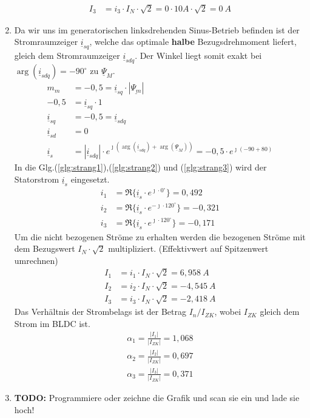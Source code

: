 \begin{solution}
\begin{enumerate}
\begin{align}
I_3 & = i_3 \cdot I_N \cdot \sqrt{2} =0 \cdot 10 A \cdot \sqrt{2} =0~A
\end{align}
\item Da wir uns im generatorischen linksdrehenden Sinus-Betrieb befinden ist der Stromraumzeiger $\underline{i}_{sq}$, welche das optimale \textbf{halbe} Bezugsdrehmoment liefert, gleich dem Stromraumzeiger $\underline{i}_{sdq}$. Der Winkel liegt somit exakt bei $\arg(\underline{i}_{sdq})=-90^\circ$ zu $\underline{\Psi}_M$.
\begin{align}
m_m &= -0,5 = \underline{i}_{sq} \cdot |\underline{\Psi_m}|\\
-0,5 &= \underline{i}_{sq} \cdot 1\\
\underline{i}_{sq} &= -0,5 = \underline{i}_{sdq} \\
\underline{i}_{sd} &= 0\\
\underline{i}_{s} &= |\underline{i}_{sdq}| \cdot e^{\jmath (\arg(\underline{i}_{sdq}) + \arg(\underline{\Psi}_{M}))}= -0,5 \cdot e^{\jmath (-90 + 80)}
\end{align}
In die Glg.(\ref{glg:strang1}),(\ref{glg:strang2}) und (\ref{glg:strang3}) wird der Statorstrom $\underline{i}_s$ eingesetzt.
\begin{align}
i_1 & = \Re \{ \underline{i}_s \cdot e^{\jmath \cdot 0 ^\circ} \} = 0,492\\
i_2 & = \Re \{ \underline{i}_s \cdot e^{-\jmath \cdot 120 ^\circ} \} = -0,321 \\
i_3 & = \Re \{ \underline{i}_s \cdot e^{\jmath \cdot 120 ^\circ} \}=  -0,171
\end{align}
Um die nicht bezogenen Ströme zu erhalten werden die bezogenen Ströme mit dem Bezugswert $I_N \cdot \sqrt{2}$ multipliziert. (Effektivwert auf Spitzenwert umrechnen)
\begin{align}
I_1 & = i_1 \cdot I_N \cdot \sqrt{2}  =6,958~A \\
I_2 & = i_2 \cdot I_N \cdot \sqrt{2} =-4,545~A \\
I_3 & = i_3 \cdot I_N \cdot \sqrt{2} =-2,418~A
\end{align}
Das Verhältnis der Strombelags ist der Betrag $I_n/ I_{ZK}$, wobei $I_{ZK}$ gleich dem Strom im BLDC ist.
\begin{align}
\alpha_1 = \frac{|I_1|}{|I_{ZK}|}= 1,068\\
\alpha_2 = \frac{|I_2|}{|I_{ZK}|}= 0,697\\
\alpha_3 = \frac{|I_3|}{|I_{ZK}|}= 0,371
\end{align}
\item \textbf{TODO:} Programmiere oder zeichne die Grafik und scan sie ein und lade sie hoch!

\end{enumerate}
\end{solution}

